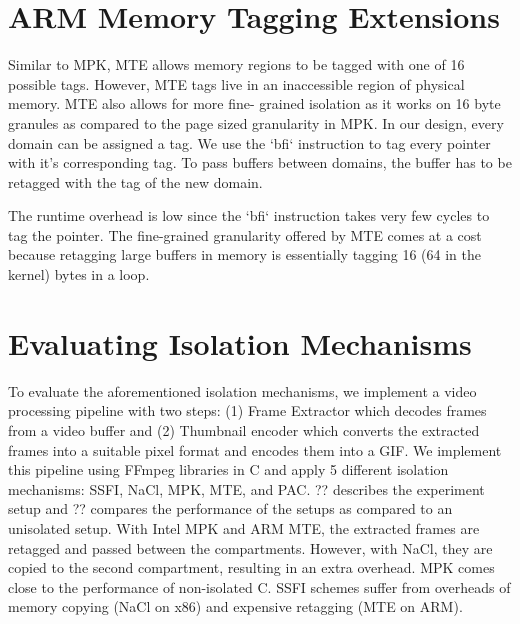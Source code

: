 \section{ARM Memory Tagging Extensions}
Similar to MPK, MTE allows memory regions to be tagged with one of 16 possible tags. However, MTE tags live in an inaccessible region of physical memory. MTE also allows for more fine- grained isolation as it works on 16 byte granules as compared to the page sized granularity in MPK. In our design, every domain can be assigned a tag. We use the ‘bfi‘ instruction to tag every pointer with it’s corresponding tag. To pass buffers between domains, the buffer has to be retagged with the tag of the new domain.

The runtime overhead is low since the ‘bfi‘ instruction takes very few cycles to tag the pointer. The fine-grained granularity offered by MTE comes at a cost because retagging large buffers in memory is essentially tagging 16 (64 in the kernel) bytes in a loop.

\section{Evaluating Isolation Mechanisms}
To evaluate the aforementioned isolation mechanisms, we implement a video processing pipeline with two steps: (1) Frame Extractor which decodes frames from a video buffer and (2) Thumbnail encoder which converts the extracted frames into a suitable pixel format and encodes them into a GIF. We implement this pipeline using FFmpeg libraries in C and apply 5 different isolation mechanisms: SSFI, NaCl, MPK, MTE, and PAC. ?? describes the experiment setup and ?? compares the performance of the setups as compared to an unisolated setup. With Intel MPK and ARM MTE, the extracted frames are retagged and passed between the compartments. However, with NaCl, they are copied to the second compartment, resulting in an extra overhead. MPK comes close to the performance of non-isolated C. SSFI schemes suffer from overheads of memory copying (NaCl on x86) and expensive retagging (MTE on ARM). 
